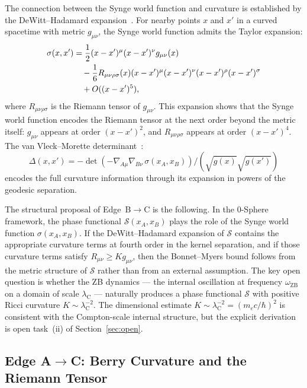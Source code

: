 \documentclass[%
 reprint, amsmath,amssymb, aps, prd, ]{revtex4-2}
\numberwithin{equation}{section}
\newcommand{\omZB}{\omega_{\text{ZB}}}
\newcommand{\lambdaC}{\lambda_{\mathrm{C}}}
\newcommand{\SyngeS}{\mathcal{S}}
\begin{document}
The connection between the Synge world function and curvature is established by the DeWitt--Hadamard expansion~\cite{DeWitt1965,Hadamard1923}.
For nearby points $x$ and $x'$ in a curved spacetime with metric $g_{\mu\nu}$, the Synge world function admits the Taylor expansion:
\begin{align}
\sigma(x,x') &= \frac{1}{2}(x-x')^\mu(x-x')^\nu g_{\mu\nu}(x)
\notag\\
&\quad - \frac{1}{6}R_{\mu\nu\rho\sigma}(x)(x-x')^\mu(x-x')^\nu(x-x')^\rho(x-x')^\sigma
\notag\\
&\quad + O((x-x')^5),
\label{eq:synge_expansion}
\end{align}
where $R_{\mu\nu\rho\sigma}$ is the Riemann tensor of $g_{\mu\nu}$.
This expansion shows that the Synge world function encodes the Riemann tensor at the next order beyond the metric itself: $g_{\mu\nu}$ appears at order $(x-x')^2$, and $R_{\mu\nu\rho\sigma}$ appears at order $(x-x')^4$.
The van Vleck--Morette determinant~\cite{VanVleck1928,DeWitt1965}:
\begin{equation}
\Delta(x,x') = -\det\!\left(-\nabla_{A\mu}\nabla_{B\nu}\,\sigma(x_A,x_B)\right) / (\sqrt{g(x)}\sqrt{g(x')})
\label{eq:van_vleck}
\end{equation}
encodes the full curvature information through its expansion in powers of the geodesic separation.

The structural proposal of Edge~B$\to$C is the following.
In the 0-Sphere framework, the phase functional $\SyngeS(x_A,x_B)$ plays the role of the Synge world function $\sigma(x_A,x_B)$.
If the DeWitt--Hadamard expansion of $\SyngeS$ contains the appropriate curvature terms at fourth order in the kernel separation, and if those curvature terms satisfy $R_{\mu\nu} \geq K g_{\mu\nu}$, then the Bonnet--Myers bound follows from the metric structure of $\SyngeS$ rather than from an external assumption.
The key open question is whether the ZB dynamics --- the internal oscillation at frequency $\omZB$ on a domain of scale $\lambdaC$ --- naturally produces a phase functional $\SyngeS$ with positive Ricci curvature $K \sim \lambdaC^{-2}$.
The dimensional estimate $K \sim \lambdaC^{-2} = (m_e c/\hbar)^2$ is consistent with the Compton-scale internal structure, but the explicit derivation is open task~(ii) of Section~\ref{sec:open}.

\subsection{Edge A$\to$C: Berry Curvature and the Riemann Tensor}
\label{subsec:edgeIII}
\end{document}
